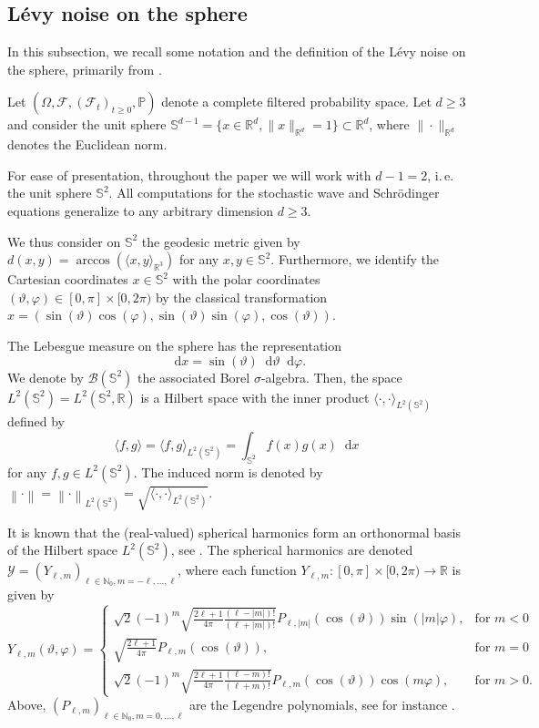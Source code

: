 \documentclass[11pt]{amsart}
\newcommand{\R}{{\mathbb R}}
\newcommand{\N}{{\mathbb N}}
\newcommand{\IS}{\mathbb{S}}
\providecommand{\norm}[1]{\left\lVert#1\right\rVert}
\newcommand*\dd{\mathop{}\!\mathrm{d}}
\begin{document}
\subsection{L\'evy noise on the sphere}
In this subsection, we recall some notation and the definition of the L\'evy noise on the sphere, primarily from \cite{MR4462619,papi2025,MR3404631}.

Let $(\Omega, \mathcal{F}, (\mathcal{F}_t)_{t\geq 0},\mathbb{P})$ denote a complete filtered probability space. Let $d\geq 3$ and consider the unit sphere $\mathbb S^{d-1}=\{x\in\R^d, \|x\|_{\R^d}=1\}\subset \R^d$, where $\|\cdot\|_{\R^d}$ denotes the Euclidean norm. 
   
For ease of presentation, throughout the paper 
we will work with $d-1=2$, i.\,e. the unit sphere $\IS^2$. 
All computations for the stochastic wave and Schrödinger equations generalize to any arbitrary dimension $d\geq3$.

We thus consider on $\IS^2$ the geodesic metric given by $d(x,y)=\arccos(\langle x,y\rangle_{\R^3})$ for any $x,y\in\IS^2$. 
Furthermore, we identify the Cartesian coordinates $x\in\IS^2$ with the polar coordinates $(\vartheta,\varphi)\in[0,\pi]\times[0,2\pi)$ by the classical transformation $x=(\sin(\vartheta)\cos(\varphi),\sin(\vartheta)\sin(\varphi),\cos(\vartheta))$.

The Lebesgue measure on the sphere has the representation
\[
\dd x = \sin(\vartheta)\dd \vartheta \dd \varphi.\]
We denote by $\mathcal{B}(\IS^2)$ the associated Borel $\sigma$-algebra. Then, the space $L^2(\IS^2)=L^2(\IS^2,\R)$ is a Hilbert space with the inner product $\langle \cdot,\cdot \rangle_{L^2(\IS^2)}$ defined by
\[
\langle f,g \rangle=\langle f,g \rangle_{L^2(\IS^2)}=\int_{\IS^2} f(x)g(x) \dd x
\]
for any $f,g\in L^2(\IS^2)$. The induced norm is denoted by
$\norm{\cdot}=\norm{\cdot}_{L^2(\IS^2)}=\sqrt{\langle \cdot,\cdot \rangle_{L^2(\IS^2)}}$.

It is known that the (real-valued) spherical harmonics form an orthonormal basis of the Hilbert space $L^2(\IS^2)$, see \cite{marinucciRandomFieldsSphere2011a}.
The spherical harmonics are denoted $\mathcal{Y}= (Y_{\ell,m})_{\ell\in\N_0, m=-\ell,\ldots,\ell}$, where each function $Y_{\ell,m}\colon[0,\pi]\times[0,2\pi) \to \R$ is given by
\begin{equation}
    Y_{\ell,m}(\vartheta,\varphi) = 
    \begin{cases}
        \sqrt{2}(-1)^m \sqrt{\frac{2\ell+1}{4\pi}\frac{(\ell-|m|)!}{(\ell+|m|)!}} P_{\ell,|m|}(\cos(\vartheta))\sin(|m|\varphi), & \text{for } m<0 \\[3mm]
     \sqrt{\frac{2\ell+1}{4\pi}} P_{\ell,m}(\cos(\vartheta)), 
     & \text{for } m=0 \\[3mm]
         \sqrt{2}(-1)^m \sqrt{\frac{2\ell+1}{4\pi}\frac{(\ell-m)!}{(\ell+m)!}} P_{\ell,m}(\cos(\vartheta))\cos(m\varphi), & \text{for }  m>0.
    \end{cases}
\end{equation}
Above, $(P_{\ell,m})_{\ell\in\N_0, m=0,\ldots,\ell}$ are the Legendre polynomials, see for instance \cite{szeg1939orthogonal}.
\end{document}
